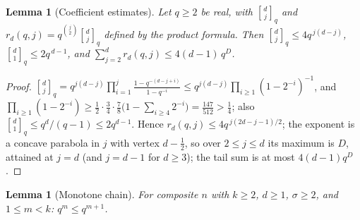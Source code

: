 \documentclass[11pt,a4paper]{article}
\newtheorem{lemma}[theorem]{Lemma}
\theoremstyle{remark}
\newcommand{\gaussbinom}[2]{\genfrac{[}{]}{0pt}{}{#1}{#2}}
\begin{document}
\begin{lemma}[Coefficient estimates]\label{lem:coef}
Let $q\ge2$ be real, with $\gaussbinom dj_q$ and
$r_d(q,j)=q^{\binom j2}\gaussbinom dj_q$ defined by the product formula.
Then $\gaussbinom dj_q\le 4q^{\,j(d-j)}$,
$\gaussbinom d1_q\le 2q^{\,d-1}$, and
$\sum_{j=2}^{d}r_d(q,j)\le 4(d-1)\,q^{D}$.
\end{lemma}

\begin{proof}
$\gaussbinom dj_q=q^{j(d-j)}\prod_{i=1}^{j}
\frac{1-q^{-(d-j+i)}}{1-q^{-i}}\le
q^{j(d-j)}\prod_{i\ge1}(1-2^{-i})^{-1}$, and
$\prod_{i\ge1}(1-2^{-i})\ge\frac12\cdot\frac34\cdot\frac78
\bigl(1-\sum_{i\ge4}2^{-i}\bigr)=\frac{147}{512}>\frac14$; also
$\gaussbinom d1_q\le q^d/(q-1)\le2q^{d-1}$. Hence
$r_d(q,j)\le4q^{\,j(2d-j-1)/2}$; the exponent is a concave parabola in
$j$ with vertex $d-\tfrac12$, so over $2\le j\le d$ its maximum is $D$,
attained at $j=d$ (and $j=d-1$ for $d\ge3$); the tail sum is at most
$4(d-1)q^D$.
\end{proof}

\begin{lemma}[Monotone chain]\label{lem:chain}
For composite $n$ with $k\ge2$, $d\ge1$, $\sigma\ge2$, and $1\le m<k$:
$q^m\le q^{m+1}$.
\end{lemma}
\end{document}
